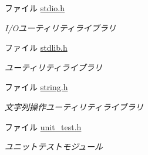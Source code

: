 \begin{DoxyCompactItemize}
ファイル \hyperlink{stdio_8h}{stdio.\+h}
\begin{DoxyCompactList}\small\item\em I/\+Oユーティリティライブラリ \end{DoxyCompactList}\item 
ファイル \hyperlink{stdlib_8h}{stdlib.\+h}
\begin{DoxyCompactList}\small\item\em ユーティリティライブラリ \end{DoxyCompactList}\item 
ファイル \hyperlink{string_8h}{string.\+h}
\begin{DoxyCompactList}\small\item\em 文字列操作ユーティリティライブラリ \end{DoxyCompactList}\item 
ファイル \hyperlink{unit__test_8h}{unit\+\_\+test.\+h}
\begin{DoxyCompactList}\small\item\em ユニットテストモジュール \end{DoxyCompactList}\end{DoxyCompactItemize}
